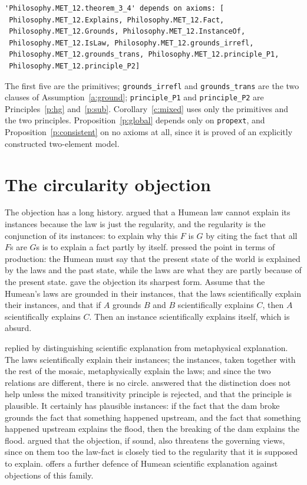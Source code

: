 \documentclass{situationist-preprint}
\begin{document}
\begin{lstlisting}
'Philosophy.MET_12.theorem_3_4' depends on axioms: [
 Philosophy.MET_12.Explains, Philosophy.MET_12.Fact,
 Philosophy.MET_12.Grounds, Philosophy.MET_12.InstanceOf,
 Philosophy.MET_12.IsLaw, Philosophy.MET_12.grounds_irrefl,
 Philosophy.MET_12.grounds_trans, Philosophy.MET_12.principle_P1,
 Philosophy.MET_12.principle_P2]
\end{lstlisting}

The first five are the primitives; \texttt{grounds\_irrefl} and \texttt{grounds\_trans} are the two clauses of Assumption~\ref{a:ground}; \texttt{principle\_P1} and \texttt{principle\_P2} are Principles~\ref{p:hg} and~\ref{p:sub}. Corollary~\ref{c:mixed} uses only the primitives and the two principles. Proposition~\ref{p:global} depends only on \texttt{propext}, and Proposition~\ref{p:consistent} on no axioms at all, since it is proved of an explicitly constructed two-element model.

\section{The circularity objection}\label{s:circularity}

The objection has a long history. \citet{Armstrong1983} argued that a Humean law cannot explain its instances because the law is just the regularity, and the regularity is the conjunction of its instances: to explain why this $F$ is $G$ by citing the fact that all $F$s are $G$s is to explain a fact partly by itself. \citet{Maudlin2007} pressed the point in terms of production: the Humean must say that the present state of the world is explained by the laws and the past state, while the laws are what they are partly because of the present state. \citet{Lange2013} gave the objection its sharpest form. Assume that the Humean's laws are grounded in their instances, that the laws scientifically explain their instances, and that if $A$ grounds $B$ and $B$ scientifically explains $C$, then $A$ scientifically explains $C$. Then an instance scientifically explains itself, which is absurd.

\citet{Loewer2012} replied by distinguishing scientific explanation from metaphysical explanation. The laws scientifically explain their instances; the instances, taken together with the rest of the mosaic, metaphysically explain the laws; and since the two relations are different, there is no circle. \citet{Lange2013} answered that the distinction does not help unless the mixed transitivity principle is rejected, and that the principle is plausible. It certainly has plausible instances: if the fact that the dam broke grounds the fact that something happened upstream, and the fact that something happened upstream explains the flood, then the breaking of the dam explains the flood. \citet{HicksVanElswyk2015} argued that the objection, if sound, also threatens the governing views, since on them too the law-fact is closely tied to the regularity that it is supposed to explain. \citet{Miller2015} offers a further defence of Humean scientific explanation against objections of this family.
\end{document}
